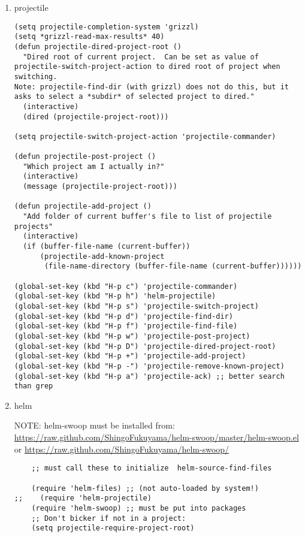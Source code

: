\documentclass[nofonts]{tufte-handout}
\begin{document}
\begin{enumerate}
\item projectile
\label{sec-1-11-9-1}

\begin{verbatim}
(setq projectile-completion-system 'grizzl)
(setq *grizzl-read-max-results* 40)
(defun projectile-dired-project-root ()
  "Dired root of current project.  Can be set as value of
projectile-switch-project-action to dired root of project when switching.
Note: projectile-find-dir (with grizzl) does not do this, but it
asks to select a *subdir* of selected project to dired."
  (interactive)
  (dired (projectile-project-root)))

(setq projectile-switch-project-action 'projectile-commander)

(defun projectile-post-project ()
  "Which project am I actually in?"
  (interactive)
  (message (projectile-project-root)))

(defun projectile-add-project ()
  "Add folder of current buffer's file to list of projectile projects"
  (interactive)
  (if (buffer-file-name (current-buffer))
      (projectile-add-known-project
       (file-name-directory (buffer-file-name (current-buffer))))))

(global-set-key (kbd "H-p c") 'projectile-commander)
(global-set-key (kbd "H-p h") 'helm-projectile)
(global-set-key (kbd "H-p s") 'projectile-switch-project)
(global-set-key (kbd "H-p d") 'projectile-find-dir)
(global-set-key (kbd "H-p f") 'projectile-find-file)
(global-set-key (kbd "H-p w") 'projectile-post-project)
(global-set-key (kbd "H-p D") 'projectile-dired-project-root)
(global-set-key (kbd "H-p +") 'projectile-add-project)
(global-set-key (kbd "H-p -") 'projectile-remove-known-project)
(global-set-key (kbd "H-p a") 'projectile-ack) ;; better search than grep
\end{verbatim}

\item helm
\label{sec-1-11-9-2}

NOTE: helm-swoop must be installed from:
\url{https://raw.github.com/ShingoFukuyama/helm-swoop/master/helm-swoop.el}
or
\url{https://raw.github.com/ShingoFukuyama/helm-swoop/}
\begin{verbatim}
    ;; must call these to initialize  helm-source-find-files

    (require 'helm-files) ;; (not auto-loaded by system!)
;;    (require 'helm-projectile)
    (require 'helm-swoop) ;; must be put into packages
    ;; Don't bicker if not in a project:
    (setq projectile-require-project-root)


\end{verbatim}
\end{enumerate}
\end{document}
